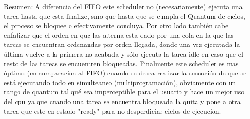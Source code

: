 Resumen:
A diferencia del FIFO este scheduler no (necesariamente) ejecuta una tarea hasta que esta finalize, sino que hasta que se cumpla el Quantum de ciclos, el proceso se bloquee o efectivamente concluya. Por otro lado también cabe enfatizar que el orden en que las alterna esta dado por una cola en la que las tareas se encuentran ordenandas por orden llegada, donde una vez ejecutada la última vuelve a la primera no acabada y sólo ejecuta la tarea idle en caso que el resto de las tareas se encuentren bloqueadas.
Finalmente este scheduler es mas óptimo (en comparación al FIFO) cuando se desea realizar la sensación de que se está ejecutando todo en simulteaneo (multiprogramación), obviamente con un rango de quantum tal qué sea imperceptible para el usuario y hace un mejor uso del cpu ya que cuando una tarea se encuentra bloqueada la quita y pone a otra tarea que este en estado "ready" para no desperdiciar ciclos de ejecución.
